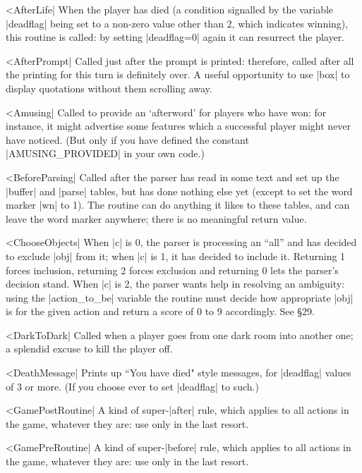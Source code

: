 ^^|AfterLife|
When the player has died (a condition signalled by the variable |deadflag|
being set to a non-zero value other than 2, which indicates winning), this
routine is called: by setting |deadflag=0| again it can resurrect the
player.

^^|AfterPrompt|
Called just after the prompt is printed: therefore, called after all the
printing for this turn is definitely over.  A useful opportunity to
use |box| to display quotations without them scrolling away.

^^|Amusing|
Called to provide an `afterword' for players who have won: for instance, it
might advertise some features which a successful player might never have
noticed.  (But only if you have defined the constant |AMUSING_PROVIDED| in
your own code.)

^^|BeforeParsing|
Called after the parser has read in some text and set up the
|buffer| and |parse| tables, but has done nothing else yet (except
to set the word marker |wn| to 1).  The routine can do anything it
likes to these tables, and can leave the word marker anywhere; there
is no meaningful return value.

^^|ChooseObjects|
When |c| is 0, the parser is processing an ``all'' and has
decided to exclude |obj| from it; when |c| is 1, it has
decided to include it.  Returning 1 forces inclusion,
returning 2 forces exclusion and returning 0 lets the parser's
decision stand.  When |c| is 2, the parser wants help in
resolving an ambiguity: using the |action_to_be| variable
the routine must decide how appropriate |obj| is for the
given action and return a score of 0 to 9 accordingly.  See \S 29.

^^|DarkToDark|
Called when a player goes from one dark room into another one; a splendid
excuse to kill the player off.

^^|DeathMessage|
Prints up ``You have died" style messages, for |deadflag| values of 3 or
more.  (If you choose ever to set |deadflag| to such.)

^^|GamePostRoutine|
A kind of super-|after| rule, which applies to all actions in the game,
whatever they are: use only in the last resort.

^^|GamePreRoutine|
A kind of super-|before| rule, which applies to all actions in the game,
whatever they are: use only in the last resort.


